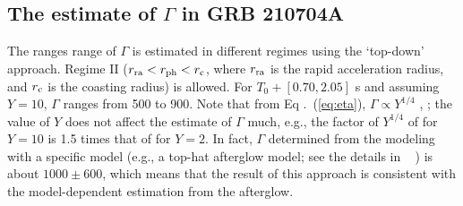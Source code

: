 \documentclass[prd,twocolumn,amsmath,amssymb,aps,linenumbers]{revtex4-2} %
\providecommand{\DIFaddtex}[1]{{\protect\color{blue} \sf #1}} %
\providecommand{\DIFdeltex}[1]{{\protect\color{red} \scriptsize #1}} %
\providecommand{\DIFaddbegin}{} %
\providecommand{\DIFaddend}{} %
\providecommand{\DIFdelbegin}{} %
\providecommand{\DIFdelend}{} %
\providecommand{\DIFadd}[1]{\texorpdfstring{\DIFaddtex{#1}}{#1}} %
\providecommand{\DIFdel}[1]{\texorpdfstring{\DIFdeltex{#1}}{}} %
\newcommand{\DIFscaledelfig}{0.5}
\newlength{\DIFdelgraphicswidth} %
\newlength{\DIFdelgraphicsheight} %
\newcommand{\DIFaddincludegraphics}[2][]{{\color{blue}\fbox{\DIFOincludegraphics[#1]{#2}}}} %
\newcommand{\DIFdelincludegraphics}[2][]{%
\sbox{\DIFdelgraphicsbox}{\DIFOincludegraphics[#1]{#2}}%
\settoboxwidth{\DIFdelgraphicswidth}{\DIFdelgraphicsbox} %
\settoboxtotalheight{\DIFdelgraphicsheight}{\DIFdelgraphicsbox} %
\scalebox{\DIFscaledelfig}{%
\parbox[b]{\DIFdelgraphicswidth}{\usebox{\DIFdelgraphicsbox}\\[-\baselineskip] \rule{\DIFdelgraphicswidth}{0em}}\llap{\resizebox{\DIFdelgraphicswidth}{\DIFdelgraphicsheight}{%
\setlength{\unitlength}{\DIFdelgraphicswidth}%
\begin{picture}(1,1)%
\thicklines\linethickness{2pt} %
{\color[rgb]{1,0,0}\put(0,0){\framebox(1,1){}}}%
{\color[rgb]{1,0,0}\put(0,0){\line( 1,1){1}}}%
{\color[rgb]{1,0,0}\put(0,1){\line(1,-1){1}}}%
\end{picture}%
}\hspace*{3pt}}} %
} %
\DeclareRobustCommand{\DIFaddbegin}{\DIFOaddbegin \let\includegraphics\DIFaddincludegraphics} %
\DeclareRobustCommand{\DIFaddend}{\DIFOaddend \let\includegraphics\DIFOincludegraphics} %
\DeclareRobustCommand{\DIFdelbegin}{\DIFOdelbegin \let\includegraphics\DIFdelincludegraphics} %
\DeclareRobustCommand{\DIFdelend}{\DIFOaddend \let\includegraphics\DIFOincludegraphics} %
\begin{document}
\subsection{The estimate of $\Gamma$ in GRB 210704A}
The \DIFdelbegin \DIFdel{ranges }\DIFdelend \DIFaddbegin \DIFadd{range }\DIFaddend of $\Gamma$ is estimated in different regimes using the `top-down' approach. Regime II ($r_{\rm ra}<r_{\rm ph}<r_{\rm c}$, where $r_{\rm ra}$ is the rapid acceleration radius, and $r_{\rm c}$ is the coasting radius) is allowed. For $T_0+[0.70, 2.05]$ s and assuming $Y=10$, $\Gamma$ ranges from 500 to 900. Note that from Eq\DIFaddbegin \DIFadd{.}\DIFaddend ~(\ref{eq:eta}), $\Gamma\propto Y^{1/4}$\DIFdelbegin \DIFdel{, }\DIFdelend \DIFaddbegin \DIFadd{; }\DIFaddend the value of $Y$ does not affect the estimate of $\Gamma$ much, e.g., the factor of $Y^{1/4}$ \DIFdelbegin \DIFdel{of }\DIFdelend \DIFaddbegin \DIFadd{for }\DIFaddend $Y=10$ is 1.5 times that \DIFdelbegin \DIFdel{of }\DIFdelend \DIFaddbegin \DIFadd{for }\DIFaddend $Y=2$. %
\DIFaddbegin \DIFadd{In fact, $\Gamma$ determined from the modeling with a specific model (e.g., a top-hat afterglow model; see the details in \mbox{%
\citealt{2026MNRAS.548ag555P}}\hskip0pt%
) is about $1000 \pm 600$, which means that the result of this approach is consistent with the model-dependent estimation from the afterglow.
}\DIFaddend 








\end{document}
